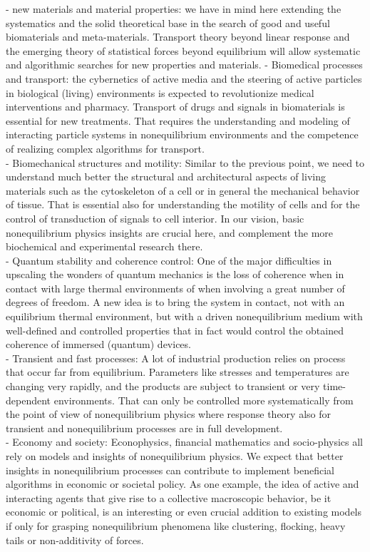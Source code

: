 - new materials and material properties: we have in mind here extending the systematics and the solid theoretical base in the search of good and useful biomaterials and meta-materials.  Transport theory beyond linear response and the emerging theory of statistical forces beyond equilibrium will allow systematic and algorithmic searches for new properties and materials.
- Biomedical processes and transport:  the cybernetics of active media and the steering of active particles in biological (living) environments is expected to revolutionize medical interventions and pharmacy.  Transport of drugs and signals in biomaterials is essential for new treatments.  That requires the understanding and modeling of interacting particle systems in nonequilibrium environments and the competence of realizing complex algorithms for transport.\\
- Biomechanical structures and motility: Similar to the previous point, we need to understand much better the structural and architectural aspects of living materials such as the cytoskeleton of a cell or in general the mechanical behavior of tissue.  That is essential also for understanding the motility of cells and for the control of transduction of signals to cell interior.  In our vision, basic nonequilibrium physics insights are crucial here, and complement the more biochemical and experimental research there.\\
- Quantum stability and coherence control: One of the major difficulties in upscaling the wonders of quantum mechanics is the loss of coherence when in contact with large thermal environments of when involving a great number of degrees of freedom.  A new idea is to bring the system in contact, not with an equilibrium thermal environment, but with a driven nonequilibrium medium with well-defined and controlled properties that in fact would control the obtained coherence of immersed (quantum) devices.\\
- Transient and fast processes: A lot of industrial production relies on process that occur far from equilibrium.  Parameters like stresses and temperatures are changing very rapidly, and the products are subject to transient or very time-dependent environments. That can only be controlled more systematically from the point of view of nonequilibrium physics where response theory also for transient and nonequilibrium processes are in full development.\\
- Economy and society:  Econophysics, financial mathematics and socio-physics all rely on models and insights of nonequilibrium physics. We expect that better insights in nonequilibrium processes can contribute to implement beneficial algorithms in economic or societal policy.  As one example, the idea of active and interacting agents that give rise to a collective macroscopic behavior, be it economic or political, is an interesting or even crucial addition to existing models if only for grasping nonequilibrium phenomena like clustering, flocking, heavy tails or non-additivity of forces.\\
